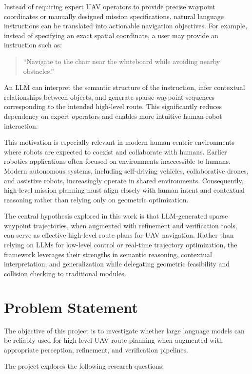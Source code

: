 \documentclass[11pt]{article}
\begin{document}
Instead of requiring expert UAV operators to provide precise waypoint coordinates or manually designed mission specifications, natural language instructions can be translated into actionable navigation objectives. For example, instead of specifying an exact spatial coordinate, a user may provide an instruction such as:

\begin{quote}
``Navigate to the chair near the whiteboard while avoiding nearby obstacles.''
\end{quote}

An LLM can interpret the semantic structure of the instruction, infer contextual relationships between objects, and generate sparse waypoint sequences corresponding to the intended high-level route. This significantly reduces dependency on expert operators and enables more intuitive human-robot interaction.

This motivation is especially relevant in modern human-centric environments where robots are expected to coexist and collaborate with humans. Earlier robotics applications often focused on environments inaccessible to humans. Modern autonomous systems, including self-driving vehicles, collaborative drones, and assistive robots, increasingly operate in shared environments. Consequently, high-level mission planning must align closely with human intent and contextual reasoning rather than relying only on geometric optimization.

The central hypothesis explored in this work is that LLM-generated sparse waypoint trajectories, when augmented with refinement and verification tools, can serve as effective high-level route plans for UAV navigation. Rather than relying on LLMs for low-level control or real-time trajectory optimization, the framework leverages their strengths in semantic reasoning, contextual interpretation, and generalization while delegating geometric feasibility and collision checking to traditional modules.

\section{Problem Statement}

The objective of this project is to investigate whether large language models can be reliably used for high-level UAV route planning when augmented with appropriate perception, refinement, and verification pipelines.

The project explores the following research questions:
\end{document}
